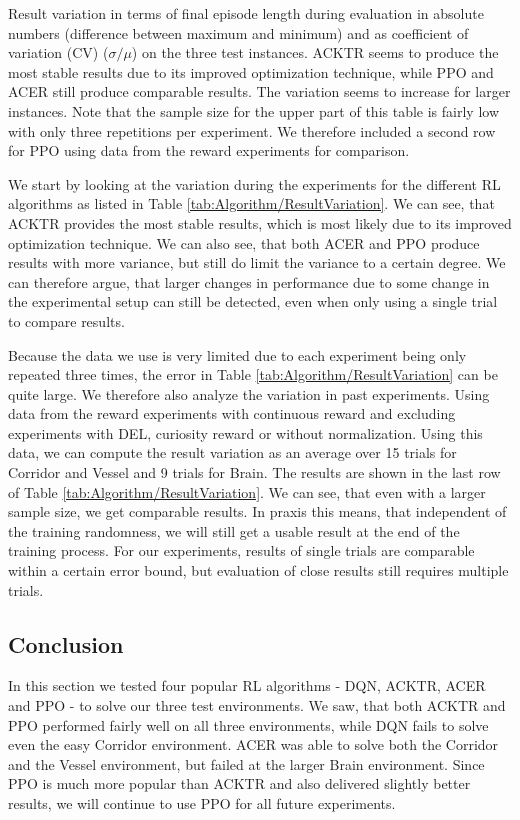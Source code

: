 \begin{table}[htp]
\begin{center}
    \end{center}
    \caption[Result Variation Using Different RL Algorithms]{Result variation in terms of final episode length during evaluation in absolute numbers (difference between maximum and minimum) and as coefficient of variation (CV) ($\sigma / \mu$) on the three test instances. ACKTR seems to produce the most stable results due to its improved optimization technique, while PPO and ACER still produce comparable results. The variation seems to increase for larger instances. Note that the sample size for the upper part of this table is fairly low with only three repetitions per experiment. We therefore included a second row for PPO using data from the reward experiments for comparison.} \label{tab:Algorithm/ResultVariation}
\end{table}

We start by looking at the variation during the experiments for the different RL algorithms as listed in Table \ref{tab:Algorithm/ResultVariation}. We can see, that ACKTR provides the most stable results, which is most likely due to its improved optimization technique. We can also see, that both ACER and PPO produce results with more variance, but still do limit the variance to a certain degree. We can therefore argue, that larger changes in performance due to some change in the experimental setup can still be detected, even when only using a single trial to compare results. 

Because the data we use is very limited due to each experiment being only repeated three times, the error in Table \ref{tab:Algorithm/ResultVariation} can be quite large. We therefore also analyze the variation in past experiments. Using data from the reward experiments with continuous reward and excluding experiments with DEL, curiosity reward or without normalization. Using this data, we can compute the result variation as an average over 15 trials for Corridor and Vessel and 9 trials for Brain. The results are shown in the last row of Table \ref{tab:Algorithm/ResultVariation}. We can see, that even with a larger sample size, we get comparable results. In praxis this means, that independent of the training randomness, we will still get a usable result at the end of the training process. For our experiments, results of single trials are comparable within a certain error bound, but evaluation of close results still requires multiple trials.

\subsection{Conclusion}
In this section we tested four popular RL algorithms - DQN, ACKTR, ACER and PPO - to solve our three test environments. We saw, that both ACKTR and PPO performed fairly well on all three environments, while DQN fails to solve even the easy Corridor environment. ACER was able to solve both the Corridor and the Vessel environment, but failed at the larger Brain environment. Since PPO is much more popular than ACKTR and also delivered slightly better results, we will continue to use PPO for all future experiments. 


